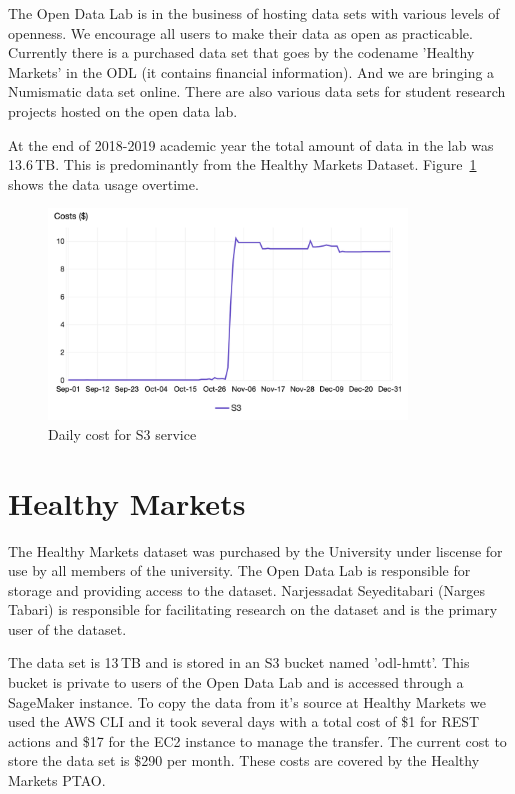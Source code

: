 The Open Data Lab is in the business of hosting data sets with various levels of openness. We encourage all users to make their data as open as practicable. Currently there is a purchased data set that goes by the codename 'Healthy Markets' in the ODL (it contains financial information). And we are bringing a Numismatic data set online. There are also various data sets for student research  projects hosted on the open data lab.

At the end of 2018-2019 academic year the total amount of data in the lab was  13.6\,TB. This is predominantly from the Healthy Markets Dataset. Figure~\ref{fig:s3cost} shows the data usage overtime.

\begin{figure}[!hbtp]
\includegraphics[width=0.85\textwidth]{images/odl-s3-usage-2018.png}
\caption{Daily cost for S3 service}
\label{fig:s3cost}
\end{figure}



\section{Healthy Markets}
The Healthy Markets dataset was purchased by the University under liscense for use by  all members of the university. The Open Data Lab is responsible for storage and providing access to the dataset. Narjessadat Seyeditabari (Narges Tabari) is responsible for facilitating research on the dataset and is the primary user of the dataset.

The data set is 13\,TB and is stored in an S3 bucket named 'odl-hmtt'. This bucket is private to users of the Open Data Lab and is accessed through a SageMaker instance. To copy the data from it's source at Healthy Markets we used the AWS CLI and it took several days with a total cost of \$1 for REST actions and \$17 for the EC2 instance to manage the transfer. The current cost to store the data set is \$290 per month. These costs are covered by the Healthy Markets PTAO.

